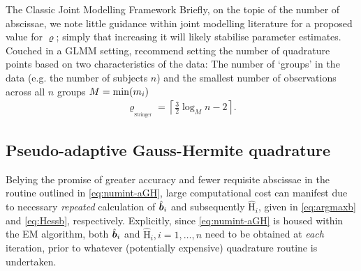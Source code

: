 \begin{chapter}{\label{cha:methods-classic}The Classic Joint Modelling Framework}
Briefly, on the topic of the number of abscissae, we note little guidance within joint modelling literature for a proposed value for $\varrho$; simply that increasing it will likely stabilise parameter estimates. Couched in a GLMM setting, \citet{Stringer2022} recommend setting the number of quadrature points based on two characteristics of the data: The number of `groups' in the data (e.g. the number of subjects $n$) and the smallest number of observations across all $n$ groups $M=\min\!\left( m_i\right)$
\begin{align}
    \varrho_{{}_\mathrm{Stringer}} = \left\lceil\frac{3}{2}\log_{M}\!n-2\right\rceil.
\label{eq:numint-stringerRecc}
\end{align}

\subsection{Pseudo-adaptive Gauss-Hermite quadrature}\label{sec:numint-paGH}
Belying the promise of greater accuracy and fewer requisite abscissae in the routine outlined in \eqref{eq:numint-aGH}, large computational cost can manifest due to necessary \textit{repeated} calculation of $\hat{\bm{b}}_i$ and subsequently $\hat{\mathrm{H}}_i$, given in \eqref{eq:argmaxb} and \eqref{eq:Hessb}, respectively. Explicitly, since \eqref{eq:numint-aGH} is housed within the EM algorithm, both $\hat{\bm{b}}_i$ and $\hat{\mathrm{H}}_i, i=1,\dots,n$ need to be obtained at \textit{each} iteration, prior to whatever (potentially expensive) quadrature routine is undertaken.


\end{chapter}
